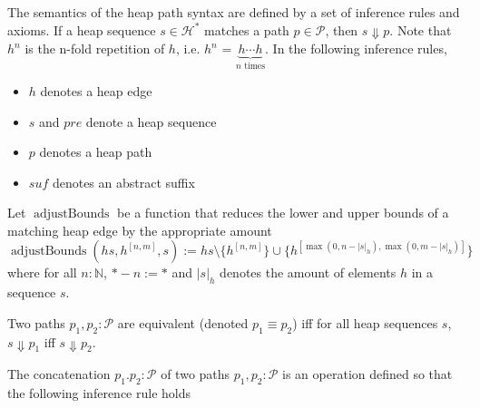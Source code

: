 \begin{definition}[Semantics]
The semantics of the heap path syntax are defined by a set of inference rules and axioms. If a heap sequence $s \in \mathcal{H}^*$ matches a path $p \in \mathcal{P}$, then $s \Downarrow p$. Note that $h^n$ is the n-fold repetition of $h$, i.e. $h^n$ = $\underbrace{h \cdots h}_{n \text{ times}}$.
In the following inference rules,
\begin{itemize}
    \item $h$ denotes a heap edge
    \item $s$ and $\mathit{pre}$ denote a heap sequence
    \item $p$ denotes a heap path
    \item $\mathit{suf}$ denotes an abstract suffix
\end{itemize}
Let $\operatorname{adjustBounds}$ be a function that reduces the lower and upper bounds of a matching heap edge by the appropriate amount \[ \operatorname{adjustBounds}(hs, h^{[n,m]}, s) := hs \setminus \{ h^{[n,m]} \} \cup \{ h^{[\max(0, n - |s|_h), \max(0, m - |s|_h)]} \} \] where
for all $n : \mathbb{N}$, $* - n := *$ and $|s|_h$ denotes the amount of elements $h$ in a sequence $s$.
\infax[P-epsilon]{\epsilon \Downarrow \epsilon}
\end{definition}

\begin{definition}[Equivalence]
Two paths $p_1, p_2 : \mathcal{P}$ are equivalent (denoted $p_1 \equiv p_2$) iff for all heap sequences $s$, $s \Downarrow p_1$ iff $s \Downarrow p_2$.
\end{definition}

\begin{definition}[Concatenation]
The concatenation $p_1.p_2 : \mathcal{P}$ of two paths $p_1, p_2 : \mathcal{P}$ is an operation defined so that the following inference rule holds
\end{definition}

